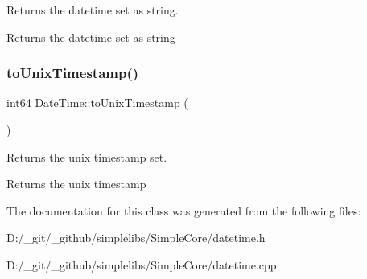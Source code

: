 Returns the datetime set as string. 

\begin{DoxyReturn}{Returns}
the datetime set as string 
\end{DoxyReturn}
\mbox{\label{class_date_time_aae25042a72973b5192469bb84f08857a}} 
\subsubsection{\texorpdfstring{toUnixTimestamp()}{toUnixTimestamp()}}
{\footnotesize\ttfamily int64 Date\+Time\+::to\+Unix\+Timestamp (\begin{DoxyParamCaption}{ }\end{DoxyParamCaption})}



Returns the unix timestamp set. 

\begin{DoxyReturn}{Returns}
the unix timestamp 
\end{DoxyReturn}


The documentation for this class was generated from the following files\+:\begin{DoxyCompactItemize}
\item 
D\+:/\+\_\+git/\+\_\+github/simplelibs/\+Simple\+Core/datetime.\+h\item 
D\+:/\+\_\+git/\+\_\+github/simplelibs/\+Simple\+Core/datetime.\+cpp\end{DoxyCompactItemize}
